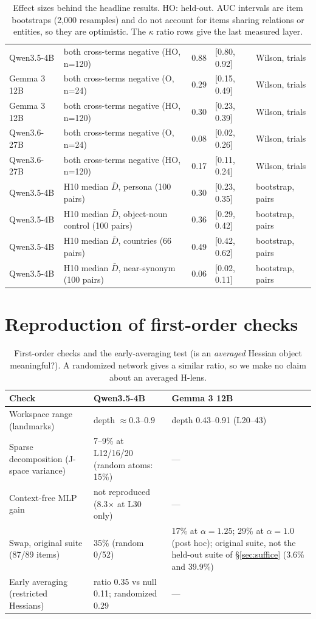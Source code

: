 \documentclass[10pt]{article}
\newcommand{\secref}[1]{\S\ref{#1}}
\begin{document}
\begin{table}[h]
\begin{tabular}{@{}p{2.9cm}p{5.1cm}p{1.9cm}p{2.2cm}p{2.3cm}@{}}
Qwen3.5-4B & both cross-terms negative (HO, n=120) & 0.88 & [0.80, 0.92] & Wilson, trials \\
Gemma 3 12B & both cross-terms negative (O, n=24) & 0.29 & [0.15, 0.49] & Wilson, trials \\
Gemma 3 12B & both cross-terms negative (HO, n=120) & 0.30 & [0.23, 0.39] & Wilson, trials \\
Qwen3.6-27B & both cross-terms negative (O, n=24) & 0.08 & [0.02, 0.26] & Wilson, trials \\
Qwen3.6-27B & both cross-terms negative (HO, n=120) & 0.17 & [0.11, 0.24] & Wilson, trials \\
Qwen3.5-4B & H10 median $\bar D$, persona (100 pairs) & 0.30 & [0.23, 0.35] & bootstrap, pairs \\
Qwen3.5-4B & H10 median $\bar D$, object-noun control (100 pairs) & 0.36 & [0.29, 0.42] & bootstrap, pairs \\
Qwen3.5-4B & H10 median $\bar D$, countries (66 pairs) & 0.49 & [0.42, 0.62] & bootstrap, pairs \\
Qwen3.5-4B & H10 median $\bar D$, near-synonym (100 pairs) & 0.06 & [0.02, 0.11] & bootstrap, pairs \\
\bottomrule
\end{tabular}
\caption{Effect sizes behind the headline results. HO: held-out. AUC intervals are item bootstraps (2,000 resamples) and do not account for items sharing relations or entities, so they are optimistic. The $\kappa$ ratio rows give the last measured layer.}
\end{table}

\section{Reproduction of first-order checks}
\label{app:gates}
\begin{table}[h]
\centering\small
\begin{tabular}{@{}p{4.3cm}p{5.4cm}p{5.2cm}@{}}
\toprule
Check & Qwen3.5-4B & Gemma 3 12B \\
\midrule
Workspace range (landmarks) & depth $\approx0.3$--$0.9$ & depth 0.43--0.91 (L20--43) \\
Sparse decomposition (J-space variance) & 7--9\% at L12/16/20 (random atoms: 15\%) & --- \\
Context-free MLP gain & not reproduced (8.3$\times$ at L30 only) & --- \\
Swap, original suite (87/89 items) & 35\% (random 0/52) & 17\% at $\alpha=1.25$; 29\% at $\alpha=1.0$ (post hoc); original suite, not the held-out suite of \secref{sec:suffice} (3.6\% and 39.9\%) \\
Early averaging (restricted Hessians) & ratio 0.35 vs null 0.11; randomized 0.29 & --- \\
\bottomrule
\end{tabular}
\caption{First-order checks and the early-averaging test (is an \emph{averaged} Hessian object meaningful?). A randomized network gives a similar ratio, so we make no claim about an averaged H-lens.}
\end{table}
\end{document}
